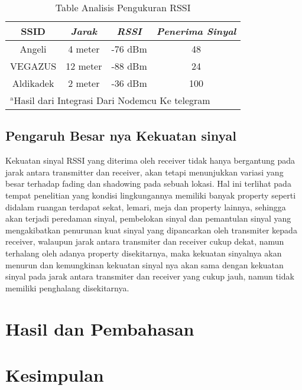 \documentclass[conference]{IEEEtran}
\begin{document}
\begin{table}[htbp]
    \caption{Table Analisis Pengukuran RSSI}
    \begin{center}
    \begin{tabular}{|c|c|c|c|}
        \hline
    \textbf{SSID} & \textbf{\textit{Jarak}}& \textbf{\textit{RSSI}}& \textbf{\textit{Penerima Sinyal}} \\
    \hline
    Angeli & 4 meter& -76 dBm & 48  \\
    \hline
    VEGAZUS & 12 meter& -88 dBm & 24  \\
    \hline
    Aldikadek & 2 meter& -36 dBm & 100   \\
    \hline
    \multicolumn{4}{l}{$^{\mathrm{a}}$Hasil dari Integrasi Dari Nodemcu Ke telegram}
    \end{tabular}
    \label{tab1}
    \end{center}
    \end{table}

\subsection{Pengaruh Besar nya Kekuatan sinyal}
Kekuatan sinyal RSSI yang diterima oleh
receiver tidak hanya bergantung pada jarak
antara transmitter dan receiver, akan tetapi
menunjukkan variasi yang besar terhadap fading
dan shadowing pada sebuah lokasi. Hal ini
terlihat pada tempat penelitian yang kondisi
lingkungannya memiliki banyak property seperti
didalam ruangan terdapat sekat, lemari, meja dan
property lainnya, sehingga akan terjadi peredaman sinyal, pembelokan sinyal dan pemantulan
sinyal yang mengakibatkan penurunan kuat
sinyal yang dipancarkan oleh transmiter kepada
receiver, walaupun jarak antara transmiter dan
receiver cukup dekat, namun terhalang oleh
adanya property disekitarnya, maka kekuatan
sinyalnya akan menurun dan kemungkinan
kekuatan sinyal nya akan sama dengan kekuatan
sinyal pada jarak antara transmiter dan receiver
yang cukup jauh, namun tidak memiliki
penghalang disekitarnya.




\section{Hasil dan Pembahasan}



\section{Kesimpulan}



\end{document}
